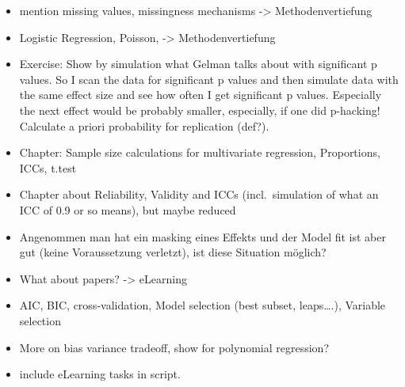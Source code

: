 \documentclass[
]{book}
\providecommand{\tightlist}{%
  \setlength{\itemsep}{0pt}\setlength{\parskip}{0pt}}
\begin{document}
\begin{itemize}
\tightlist
\item
  mention missing values, missingness mechanisms -\textgreater{} Methodenvertiefung
\item
  Logistic Regression, Poisson, -\textgreater{} Methodenvertiefung
\item
  Exercise: Show by simulation what Gelman talks about with significant p values. So I scan the data
  for significant p values and then simulate data with the same effect size and see how often
  I get significant p values. Especially the next effect would be probably smaller,
  especially, if one did p-hacking! Calculate a priori probability for replication (def?).
\item
  Chapter: Sample size calculations for multivariate regression, Proportions, ICCs, t.test
\item
  Chapter about Reliability, Validity and ICCs (incl.~simulation of what an ICC of 0.9 or so means), but maybe reduced
\item
  Angenommen man hat ein masking eines Effekts und der Model fit ist aber gut (keine Voraussetzung verletzt),
  ist diese Situation möglich?
\item
  What about papers? -\textgreater{} eLearning
\item
  AIC, BIC, cross-validation, Model selection (best subset, leaps\ldots.), Variable selection
\item
  More on bias variance tradeoff, show for polynomial regression?
\item
  include eLearning tasks in script.
\end{itemize}


\end{document}
